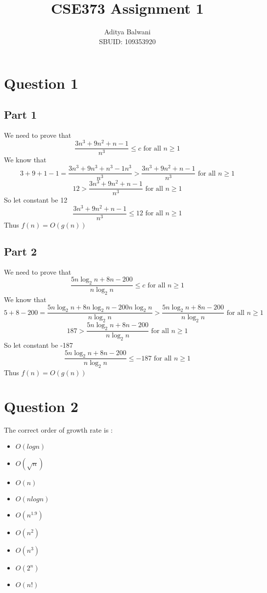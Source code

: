 \documentclass{article}
\title{\textbf{CSE373 Assignment 1}}
\author{Aditya Balwani\\SBUID: 109353920}
\begin{document}
\maketitle
{}
\section{Question 1}
    \subsection{Part 1}
        We need to prove that
        \[\frac{3n^3 + 9n^2 + n - 1}{n^3} \le c \textrm{ for all } n \ge 1\]
        We know that
        \[3 + 9 + 1 - 1 = \frac{3n^3 + 9n^3 + n^3 - 1n^3}{n^3} > \frac{3n^3 + 9n^2 + n - 1}{n^3} \textrm{ for all } n \ge 1\]
        \[12 > \frac{3n^3 + 9n^2 + n - 1}{n^3} \textrm{ for all } n \ge 1\]
        So let constant be 12
        \[\frac{3n^3 + 9n^2 + n - 1}{n^3} \le 12 \textrm{ for all } n \ge 1\]
        Thus $ f(n) = O(g(n))$

    \subsection{Part 2}
        We need to prove that
        \[\frac{5n\log_2 n + 8n - 200}{n\log_2 n} \le c \textrm{ for all } n \ge 1\]
        We know that
        \[5 + 8 - 200 = \frac{5n\log_2 n + 8n\log_2 n - 200n\log_2 n}{n\log_2 n} > \frac{5n\log_2 n + 8n - 200}{n\log_2 n} \textrm{ for all } n \ge 1\]
        \[187 > \frac{5n\log_2 n + 8n - 200}{n\log_2 n} \textrm{ for all } n \ge 1\]
        So let constant be -187
        \[\frac{5n\log_2 n + 8n - 200}{n\log_2 n} \le -187 \textrm{ for all } n \ge 1\]
        Thus $ f(n) = O(g(n))$

\section{Question 2}
    The correct order of growth rate is :
    \begin{itemize}
        \item $O(log n)$
        \item $O(\sqrt{n})$
        \item $O(n)$
        \item $O(n log n)$
        \item $O(n^1.9)$
        \item $O(n^2)$
        \item $O(n^3)$
        \item $O(2^n)$
        \item $O(n!)$
    \end{itemize}
\end{document}
